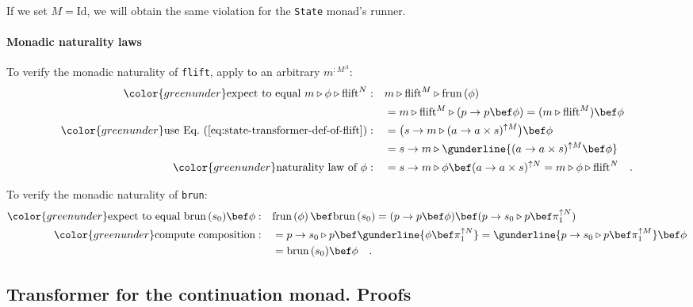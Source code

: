 If we set $M=\text{Id}$, we will obtain the same violation for the
\lstinline!State! monad\textsf{'}s runner.

\paragraph{Monadic naturality laws}

To verify the monadic naturality of \lstinline!flift!, apply to an
arbitrary $m^{:M^{A}}$:
\begin{align*}
{\color{greenunder}\text{expect to equal }m\triangleright\phi\triangleright\text{flift}^{N}:}\quad & m\triangleright\text{flift}^{M}\triangleright\text{frun}\left(\phi\right)\\
 & =m\triangleright\text{flift}^{M}\triangleright(p\rightarrow p\bef\phi)=(m\triangleright\text{flift}^{M})\bef\phi\\
{\color{greenunder}\text{use Eq.~(\ref{eq:state-transformer-def-of-flift})}:}\quad & =\big(s\rightarrow m\triangleright(a\rightarrow a\times s)^{\uparrow M}\big)\bef\phi\\
 & =s\rightarrow m\triangleright\gunderline{(a\rightarrow a\times s)^{\uparrow M}\bef\phi}\\
{\color{greenunder}\text{naturality law of }\phi:}\quad & =s\rightarrow m\triangleright\phi\bef(a\rightarrow a\times s)^{\uparrow N}=m\triangleright\phi\triangleright\text{flift}^{N}\quad.
\end{align*}

To verify the monadic naturality of \lstinline!brun!:
\begin{align*}
{\color{greenunder}\text{expect to equal }\text{brun}\,(s_{0})\bef\phi:}\quad & \text{frun}\left(\phi\right)\bef\text{brun}\,(s_{0})=(p\rightarrow p\bef\phi)\bef(p\rightarrow s_{0}\triangleright p\bef\pi_{1}^{\uparrow N})\\
{\color{greenunder}\text{compute composition}:}\quad & =p\rightarrow s_{0}\triangleright p\bef\gunderline{\phi\bef\pi_{1}^{\uparrow N}}=\gunderline{p\rightarrow s_{0}\triangleright p\bef\pi_{1}^{\uparrow M}}\bef\phi\\
 & =\text{brun}\,(s_{0})\bef\phi\quad.
\end{align*}


\subsection{Transformer for the continuation monad. Proofs\label{subsec:Transformer-for-the-continuation-monad}}

